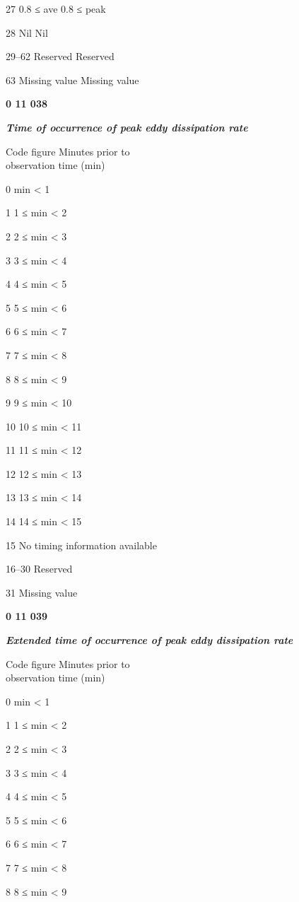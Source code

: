 27 0.8 ≤ ave 0.8 ≤ peak

28 Nil Nil

29--62 Reserved Reserved

63 Missing value Missing value

\textbf{0 11 038}

\emph{\textbf{Time of occurrence of peak eddy dissipation rate}}

Code figure Minutes prior to\\
observation time (min)

0 min \textless{} 1

1 1 ≤ min \textless{} 2

2 2 ≤ min \textless{} 3

3 3 ≤ min \textless{} 4

4 4 ≤ min \textless{} 5

5 5 ≤ min \textless{} 6

6 6 ≤ min \textless{} 7

7 7 ≤ min \textless{} 8

8 8 ≤ min \textless{} 9

9 9 ≤ min \textless{} 10

10 10 ≤ min \textless{} 11

11 11 ≤ min \textless{} 12

12 12 ≤ min \textless{} 13

13 13 ≤ min \textless{} 14

14 14 ≤ min \textless{} 15

15 No timing information available

16--30 Reserved

31 Missing value

\textbf{0 11 039}

\emph{\textbf{Extended time of occurrence of peak eddy dissipation rate}}

Code figure Minutes prior to\\
observation time (min)

0 min \textless{} 1

1 1 ≤ min \textless{} 2

2 2 ≤ min \textless{} 3

3 3 ≤ min \textless{} 4

4 4 ≤ min \textless{} 5

5 5 ≤ min \textless{} 6

6 6 ≤ min \textless{} 7

7 7 ≤ min \textless{} 8

8 8 ≤ min \textless{} 9

